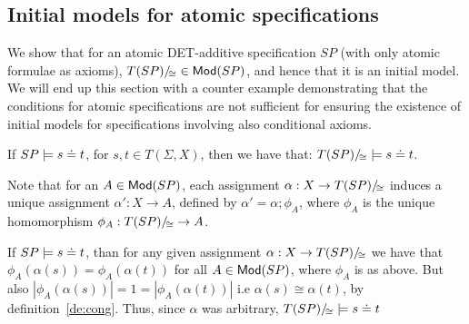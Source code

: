 \documentclass[10pt]{article}
\begin{document}
\subsection{Initial models for atomic specifications}\label{sub:atomic}
We show that for an atomic DET-additive
specification $SP$ (with only atomic formulae as axioms),
$T(SP)/\!_{\cong}\in{\sf {Mod}}(SP)$, and hence that it is an initial model. We
will end up this section with a counter example demonstrating that the
conditions for atomic specifications are not sufficient for ensuring the
existence of initial models for specifications involving also conditional axioms.

\begin{lemma}
\label{le:eql}
If $SP \models s \mathrel{\dot{=} } t$, for $s, t \in T(\Sigma,X)$, then we have that:
$T(SP)/\!_{\cong} \models {s \mathrel{\dot{=} }t}$.
\end{lemma}
%
\begin{PROOF}
Note that for an $A\in {\sf {Mod}}(SP)$, each assignment $\alpha: X \to T(SP)/\!_{\cong}$ induces a unique
assignment $\alpha':X \to A$, defined by $\alpha'=
\alpha;\phi_A$, where $\phi_A$ is the unique homomorphism $\phi_A:T(SP)/\!_{\cong} \to
A$.

If $SP \models s \mathrel{\dot{=} } t$, than for any given assignment $\alpha:X
\to T(SP)/\!_{\cong}$ we have that $\phi_A(\alpha(s))= \phi_A(\alpha(t))$ for all $A
\in {\sf {Mod}}(SP)$, where $\phi_A$ is as above. But also $|\phi_A(\alpha(s))|=1=|\phi_A(\alpha(t))|$ i.e
$\alpha(s) \cong \alpha(t)$, by definition~\ref{de:cong}. Thus, since
$\alpha$ was arbitrary, $T(SP)/\!_{\cong} \models s \mathrel{\dot{=} } t$
\end{PROOF}
\end{document}
